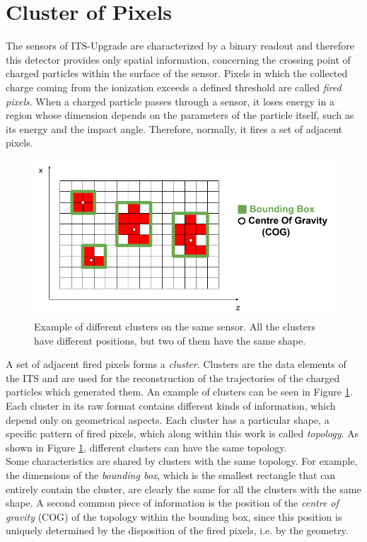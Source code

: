 \section{Cluster of Pixels}
\label{sec:cluster}
The sensors of ITS-Upgrade are characterized by a binary readout and therefore this detector provides only spatial information, concerning the crossing point of charged particles within the surface of the sensor. Pixels in which the collected charge coming from the ionization exceeds a defined threshold are called \textit{fired pixels}. When a charged particle passes through a sensor, it loses energy in a region whose dimension depends on the parameters of the particle itself, such as its energy and the impact angle. Therefore, normally, it fires a set of adjacent pixels.\\
%
\begin{figure}
  \centering
  \includegraphics[scale=0.55]{figures/cluster.png}
  \caption{Example of different clusters on the same sensor. All the clusters have different positions, but two of them have the same shape.}
  \label{fig:clusters}
\end{figure}
%
A set of adjacent fired pixels forms a \textit{cluster}. Clusters are the data elements of the ITS and are used for the reconstruction of the trajectories of the charged particles which generated them. An example of clusters can be seen in Figure \ref{fig:clusters}. Each cluster in its raw format contains different kinds of information, which depend only on geometrical aspects. Each cluster has a particular shape, a specific pattern of fired pixels, which along within this work is called \textit{topology}. As shown in Figure \ref{fig:clusters}, different clusters can have the same topology.\\
Some characteristics are shared by clusters with the same topology. For example, the dimensions of the \textit{bounding box}, which is the smallest rectangle that can entirely contain the cluster, are clearly the same for all the clusters with the same shape. A second common piece of information is the position of the \textit{centre of gravity} (COG) of the topology within the bounding box, since this position is uniquely determined by the disposition of the fired pixels, i.e. by the geometry.
